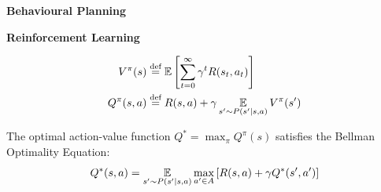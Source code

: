 \documentclass[a0paper,portrait,fontscale=0.3, margin=2cm]{baposter}
\begin{document}
\begin{poster}
{\textbf{Behavioural Planning}

\textbf{Reinforcement Learning}

\begin{align*}
V^\pi(s) &\eqdef \expectedvalue\left[\sum_{t=0}^\infty \gamma^t R(s_t, a_t)\right]\\
Q^\pi(s, a) &\eqdef R(s, a) + \gamma \expectedvalueover{s'\sim P(s'|s, a)} V^\pi(s')
\end{align*}

The optimal action-value function $Q^* =  \max_\pi Q^\pi(s)$ satisfies the Bellman Optimality Equation:
\begin{equation*}
Q^*(s, a) = \operatorname*{\mathbb{E}}\limits_{s'\sim P(s'|s, a)} \max_{a'\in A} \left[R(s, a) + \gamma Q^*(s', a')\right]
\end{equation*}

}

\end{poster}
\end{document}
